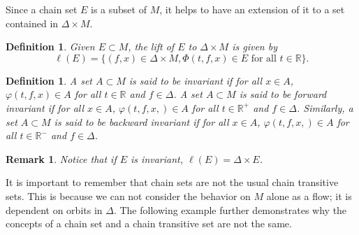 \documentclass[11pt]{article}
\newtheorem{defn}[thm]{Definition}
\newtheorem{remark}[thm]{Remark}
\begin{document}
\indent Since a chain set $E$ is a subset of $M$, it helps to have an extension of it to a set contained in $\Delta\times M$. 

\begin{defn}
Given $E\subset M$, the lift of $E$ to $\Delta\times M$ is given by
$$\ell(E)=\{(f,x)\in \Delta\times M,\Phi(t,f,x)\in E \text{ for all }t\in\mathbb{R}\}.$$
\end{defn}

\begin{defn}
A set $A\subset M$ is said to be invariant if for all $x\in A$, $\varphi(t,f,x)\in A$ for all $t\in\mathbb{R}$ and $f\in\Delta$.
A set $A\subset M$ is said to be forward invariant if for all $x\in A$, $\varphi(t,f,x,)\in A$ for all $t\in \mathbb{R}^+$ and $f\in\Delta$.  Similarly, a set $A\subset M$ is said to be backward invariant if for all $x\in A$, $\varphi(t,f,x,)\in A$ for all $t\in \mathbb{R}^-$ and $f\in\Delta$.
\end{defn}


\begin{remark}
Notice that if $E$ is invariant, $\ell(E)=\Delta\times E$. 
\end{remark}

\indent It is important to remember that chain sets are not the usual chain transitive sets. This is because we can not consider the behavior on $M$ alone as a flow; it is dependent on orbits in $\Delta$. The following example further demonstrates why the concepts of a chain set and a chain transitive set are not the same.
\end{document}
